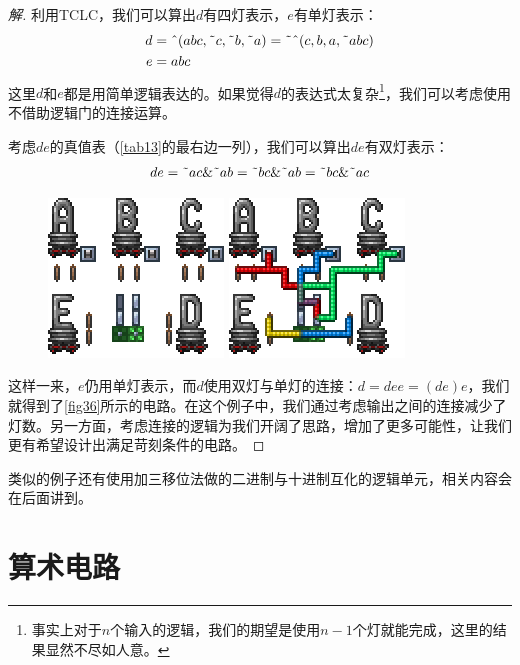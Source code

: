 \begin{proof}[解]
利用TCLC，我们可以算出$d$有四灯表示，$e$有单灯表示：
\begin{align*}
d&=\textnormal{\^{}}(abc,\textnormal{\~{}}c,\textnormal{\~{}}b,\textnormal{\~{}}a)=\textnormal{\~{}}\textnormal{\^{}}(c,b,a,\textnormal{\~{}}abc)\\
e&=abc
\end{align*}
这里$d$和$e$都是用简单逻辑表达的。如果觉得$d$的表达式太复杂\footnote{事实上对于$n$个输入的逻辑，我们的期望是使用$n-1$个灯就能完成，这里的结果显然不尽如人意。}，我们可以考虑使用不借助逻辑门的连接运算。

考虑$de$的真值表（\autoref{tab13}的最右边一列），我们可以算出$de$有双灯表示：
$$de=\textnormal{\~{}}ac\&\textnormal{\~{}}ab=\textnormal{\~{}}bc\&\textnormal{\~{}}ab=\textnormal{\~{}}bc\&\textnormal{\~{}}ac$$

\begin{figure}[!ht]
\centering
\includegraphics{images/406.png}
\qquad
\includegraphics{images/407.png}
\caption{}\label{fig36}
\end{figure}

这样一来，$e$仍用单灯表示，而$d$使用双灯与单灯的连接：$d=dee=(de)e$，我们就得到了\autoref{fig36}所示的电路。在这个例子中，我们通过考虑输出之间的连接减少了灯数。另一方面，考虑连接的逻辑为我们开阔了思路，增加了更多可能性，让我们更有希望设计出满足苛刻条件的电路。
\end{proof}

类似的例子还有使用加三移位法做的二进制与十进制互化的逻辑单元，相关内容会在后面讲到。

\section{算术电路}\label{sec34}


